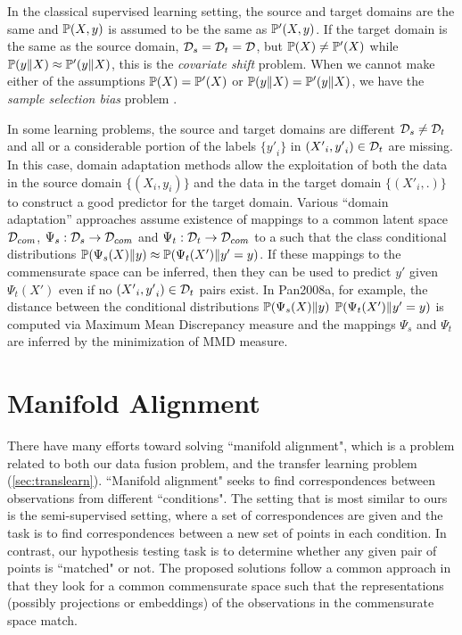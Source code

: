 \documentclass[12pt,oneside,final]{thesis}\usepackage[]{graphicx}\usepackage[]{color}
\begin{document}
In the classical supervised learning setting, the source and target domains are the same and  $\mathbb{P}(X,y)$ is assumed to be the same as $\mathbb{P}'(X,y)$. If the target domain is the same as the source domain, ${\mathcal{D}}_s={\mathcal{D}}_t=\mathcal{D}$, but $\mathbb{P}(X) \neq\mathbb{P}'(X)$ while $\mathbb{P}(y\|X) \approx \mathbb{P}'(y \| X)$, this is the \emph{covariate shift} problem.  When we cannot make either of the assumptions $\mathbb{P}(X) = \mathbb{P}'(X)$ or $\mathbb{P}(y\|X) = \mathbb{P}'(y \| X)$, we have the \emph{sample selection bias} problem \cite{Zadrozny2004a}.


 In some learning problems, the source and target domains are different ${\mathcal{D}}_s \neq {\mathcal{D}}_t$ and all or a considerable portion of  the labels $\{{y'}_i\}$  in $\left({X'}_i,{y'}_i\right) \in {\mathcal{D}}_t$ are missing. In this case, domain adaptation methods allow the exploitation of both the  data in the source domain $\{\left({X}_i,{y}_i\right)\}$ and the data in the target domain  $\{\left({X'}_i,.\right)\}$ to construct a good predictor for the target domain\cite{DaumeIII2006,Ben-David_Dom_Adapt2007,Ling2008,Pan2008a}.
Various ``domain adaptation'' approaches\cite{Pan2008a,LowRankSharedConceptChen2012a} assume existence of mappings to a common latent space ${\mathcal{D}}_{com}$,  $\Psi_s:{\mathcal{D}}_s \rightarrow {\mathcal{D}}_{com} $ and $\Psi_t:{\mathcal{D}}_t \rightarrow {\mathcal{D}}_{com}$ to a  such that the class conditional distributions $\mathbb{P}(\Psi_s(X) \|y) \approx \mathbb{P}(\Psi_t(X') \| y'=y)$.  If these mappings to the commensurate space can be inferred, then they can be used to predict $y'$ given $\Psi_t(X')$ even if no $\left({X'}_i,{y'}_i\right) \in {\mathcal{D}}_t$ pairs exist. 
In {Pan2008a}, for example, the distance between the conditional distributions $\mathbb{P}(\Psi_s(X) \|y) $ $\mathbb{P}(\Psi_t(X') \| y'=y)$ is computed via  Maximum Mean Discrepancy
measure and  the mappings $\Psi_s$ and  $\Psi_t$  are inferred by the minimization of MMD measure.

\section[Manifold Matching]{Manifold Alignment}
There have many efforts toward solving ``manifold alignment", which is a problem related to both our data fusion problem, and the transfer learning problem (\autoref{sec:translearn}). ``Manifold alignment" seeks to find correspondences between observations from different ``conditions". The setting that is most similar to ours is the semi-supervised setting, where a set of correspondences are given and the task is to find correspondences between a new set of points in each condition. In contrast, our hypothesis testing task is to determine whether any given pair of points is ``matched" or not. The proposed solutions follow a common approach in that they look for a common commensurate space such that the representations (possibly projections or embeddings) of the observations in the commensurate space match.
\end{document}
